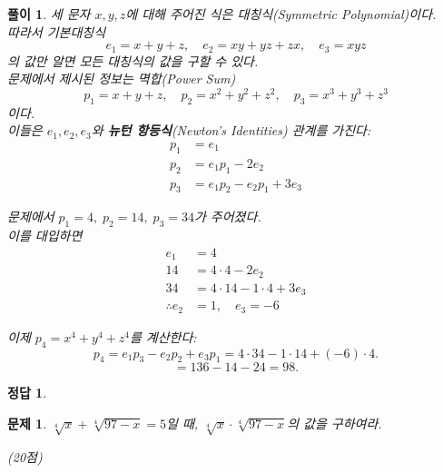 \documentclass[12pt,a4paper]{article}
\theoremstyle{test_form}
\newtheorem{problem}{문제}[section]
\newtheorem*{solution}{풀이}
\newtheorem*{answer}{정답}
\begin{document}
\begin{solution}
    \setlength{\parindent}{0pt}
    
    세 문자 $x,y,z$에 대해 주어진 식은 \emph{대칭식}(Symmetric Polynomial)이다.  
    \\따라서 기본대칭식
    \[
    e_1 = x+y+z, \quad e_2 = xy+yz+zx, \quad e_3 = xyz
    \]
    의 값만 알면 모든 대칭식의 값을 구할 수 있다.
    \\
    문제에서 제시된 정보는 멱합(Power Sum)
    \[
    p_1 = x+y+z, \quad p_2 = x^2+y^2+z^2, \quad p_3 = x^3+y^3+z^3
    \]
    이다. 
    \\이들은 $e_1,e_2,e_3$와 \textbf{뉴턴 항등식}(Newton's Identities) 관계를 가진다:
    \begin{align}
        p_1 &= e_1 \nonumber \\
        p_2 &= e_1p_1 - 2e_2 \nonumber \\
        p_3 &= e_1p_2 - e_2p_1 + 3e_3 \nonumber
    \end{align}
    
    문제에서 $p_1=4,\;p_2=14,\;p_3=34$가 주어졌다. \\
    이를 대입하면
    \begin{align}
        e_1 &= 4 \nonumber \\
        14 &= 4\cdot4 - 2e_2 \nonumber \\
        34 &= 4\cdot14 - 1\cdot4 + 3e_3 \nonumber \\
        \therefore e_2 &= 1, \quad e_3 = -6 \nonumber
    \end{align}
    
    이제 $p_4 = x^4+y^4+z^4$를 계산한다:
    \[
    p_4 = e_1p_3 - e_2p_2 + e_3p_1
    = 4\cdot34 - 1\cdot14 + (-6)\cdot4.
    \]
    \[
    =136 - 14 - 24 = 98.
    \]    
\end{solution}
    

\begin{answer}
\hfill {}
\end{answer}

\newpage

\begin{problem}
\(\sqrt[4]{x}+\sqrt[4]{97-x}=5\)일 때, \(\sqrt[4]{x}\cdot\sqrt[4]{97-x}\)의 값을 구하여라.
\begin{flushright}(20점)\end{flushright}
\end{problem}
\end{document}
